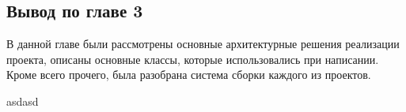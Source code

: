 \documentclass[14pt,a4paper]{scrartcl}
\begin{document}
    
    
    

    \subsection{Вывод по главе 3}\label{subsec:3-conclusion}\indent

    В данной главе были рассмотрены основные архитектурные решения реализации проекта, описаны основные классы, которые использовались при написании.
    Кроме всего прочего, была разобрана система сборки каждого из проектов.

    

    

    
    asdasd
\end{document}
